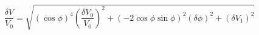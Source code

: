 \begin{equation}
\label{eq:delta_V_Malus}
\frac{\delta V}{V_0} = \sqrt{ {\left(\cos{\phi}\right)}^4\left(\frac{\delta V_0}{V_0}\right)^2 + \left(-2 \cos{\phi}\sin{\phi} \right)^2(\delta \phi)^2+ (\delta V_1)^2}
\end{equation}